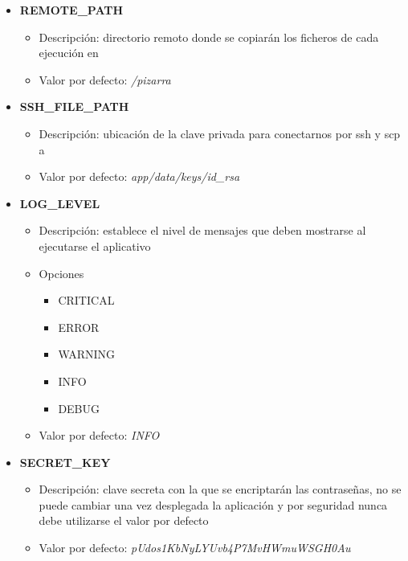 \documentclass[11pt,spanish,listoffigures,listoftables]{tfgetsinf}
\begin{document}
\begin{itemize}
	\item \textbf{REMOTE\_PATH}
	\begin{itemize}
		\item Descripción: directorio remoto donde se copiarán los ficheros de cada ejecución en \kahan
		\item Valor por defecto: \textit{/pizarra}
	\end{itemize}
\end{itemize}

\begin{itemize}
	\item \textbf{SSH\_FILE\_PATH}
	\begin{itemize}
		\item Descripción: ubicación de la clave privada para conectarnos por \acrshort{ssh} y \acrshort{scp} a \kahan
		\item Valor por defecto: \textit{app/data/keys/id\_rsa}
	\end{itemize}
\end{itemize}


\begin{itemize}
	\item \textbf{LOG\_LEVEL}
	\begin{itemize}
		\item Descripción: establece el nivel de mensajes que deben mostrarse al ejecutarse el aplicativo
		\item Opciones
		\begin{itemize}
			\item CRITICAL
			\item ERROR
			\item WARNING
			\item INFO
			\item DEBUG
		\end{itemize}
		\item Valor por defecto: \textit{INFO}
	\end{itemize}
\end{itemize}

\begin{itemize}
	\item \textbf{SECRET\_KEY}
	\begin{itemize}
		\item Descripción: clave secreta con la que se encriptarán las contraseñas, no se puede cambiar una vez desplegada la aplicación y por seguridad nunca debe utilizarse el valor por defecto
		\item Valor por defecto: \textit{pUdos1KbNyLYUvb4P7MvHWmuWSGH0Au}
	\end{itemize}
\end{itemize}
\end{document}
